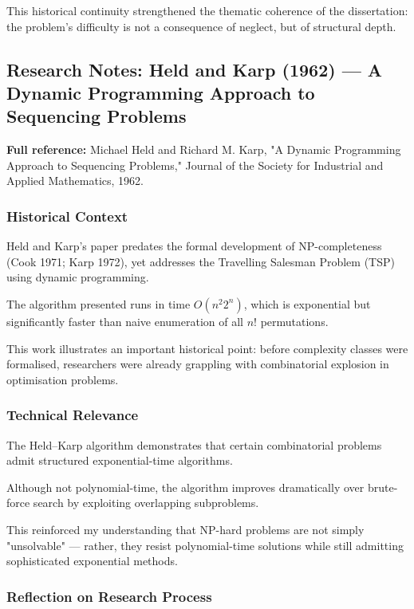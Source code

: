 \documentclass[12pt]{article}
\begin{document}
This historical continuity strengthened the thematic coherence of the dissertation: the problem's difficulty is not a consequence of neglect, but of structural depth.

\subsection{Research Notes: Held and Karp (1962) --- A Dynamic Programming Approach to Sequencing Problems}

\textbf{Full reference:} Michael Held and Richard M. Karp,
"A Dynamic Programming Approach to Sequencing Problems,"
Journal of the Society for Industrial and Applied Mathematics, 1962.

\subsubsection*{Historical Context}

Held and Karp's paper predates the formal development of NP-completeness (Cook 1971; Karp 1972), yet addresses the Travelling Salesman Problem (TSP) using dynamic programming.

The algorithm presented runs in time $O(n^2 2^n)$, which is exponential but significantly faster than naive enumeration of all $n!$ permutations.

This work illustrates an important historical point: before complexity classes were formalised, researchers were already grappling with combinatorial explosion in optimisation problems.

\subsubsection*{Technical Relevance}

The Held–Karp algorithm demonstrates that certain combinatorial problems admit structured exponential-time algorithms.

Although not polynomial-time, the algorithm improves dramatically over brute-force search by exploiting overlapping subproblems.

This reinforced my understanding that NP-hard problems are not simply "unsolvable" --- rather, they resist polynomial-time solutions while still admitting sophisticated exponential methods.

\subsubsection*{Reflection on Research Process}
\end{document}
